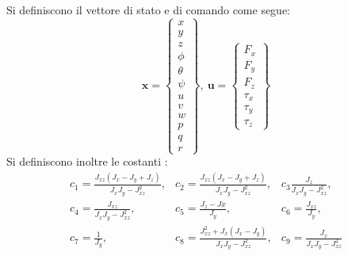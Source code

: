 Si definiscono il vettore di stato e di comando come segue:
\[ 
	\mathbf{x} = \begin{Bmatrix}
		x \\ y \\ z \\ \phi \\ \theta \\ \psi \\ u \\ v \\ w \\ p \\ q \\ r
	\end{Bmatrix}, \  \mathbf{u} = \begin{Bmatrix}
	F_x \\ F_y \\ F_z \\ \tau_x \\ \tau_y \\ \tau_z
	\end{Bmatrix}
\]
Si definiscono inoltre le costanti : 
\[ 
	\begin{matrix}
	c_1 = \frac{J_{xz} (J_x -J_y + J_z)}{J_x J_y- J_{xz}^2} , & c_2 = \frac{J_{xz} (J_x -J_y +J_z)}{J_x J_y-J_{xz}^2}, &c_3 \frac{J_z}{J_x J_y - J_{xz}^2}, \\
	c_4 = \frac{J_{xz}}{J_x J_y -J_{xz}^2} ,& c_5 = \frac{J_z - J x}{J_y},& c_6 = \frac{J_{xz}}{J_y}, \\
	c_7 = \frac{1}{J_y} ,& c_8 = \frac{J_{xz}^2 + J_x (J_x - J_y)}{J_x J_y - J_{xz}^2},& c_9 =  \frac{J_x}{J_x J_y -J_{xz}^2}
	\end{matrix}
\]

